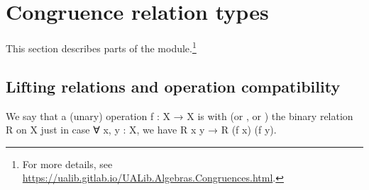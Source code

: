 \documentclass[a4paper,UKenglish,cleveref,autoref,thm-restate,11pt]{lipics-v2021}
\begin{document}
\section{Congruence relation types}\label{sec:congr-relat-types}

This section describes parts of the \ualibCongruences module.\footnote{For more details, see \url{https://ualib.gitlab.io/UALib.Algebras.Congruences.html}.}

\subsection{Lifting relations and operation compatibility}\label{ssec:compatibility}
We say that a (unary) operation \ab f \as : \ab X \as → \ab X is  with (or , or ) the binary relation \ab R on \ab X just in case \as ∀ \ab x, \ab y \as : X, we have \ab R \ab x \ab y \as →  \ab R (\ab f \ab x) (\ab f \ab y).
\end{document}

